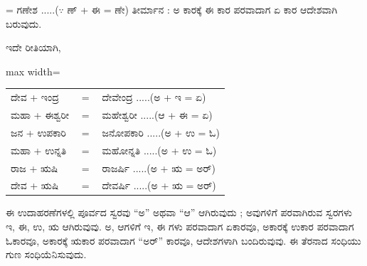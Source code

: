 \indent  = ಗಣೇಶ .....(\ensuremath{\because} ಣ್‌ + ಈ = ಣೇ) ತೀರ್ಮಾನ : ಅ ಕಾರಕ್ಕೆ ಈ ಕಾರ ಪರವಾದಾಗ ಏ ಕಾರ ಆದೇಶವಾಗಿ ಬರುವುದು.\par

\indent ಇದೇ ರೀತಿಯಾಗಿ,\par

\begin{kbvderiv}
\vspace{4pt plus 3pt minus 1pt}
\begin{center}\begin{adjustbox}{max width=\textwidth}
{\renewcommand{\arraystretch}{1.22}\setlength{\tabcolsep}{4pt}
\begin{tabular}{l c l}
ದೇವ + ಇಂದ್ರ & {\color{kbvgrey}$=$} & ದೇವೇಂದ್ರ .....(ಅ + ಇ = ಏ) \\
ಮಹಾ + ಈಶ್ವರೀ & {\color{kbvgrey}$=$} & ಮಹೇಶ್ವರೀ .....(ಆ + ಈ = ಏ) \\
ಜನ + ಉಪಕಾರಿ & {\color{kbvgrey}$=$} & ಜನೋಪಕಾರಿ .....(ಅ + ಉ = ಓ) \\
ಮಹಾ + ಉನ್ನತಿ & {\color{kbvgrey}$=$} & ಮಹೋನ್ನತಿ .....(ಅ + ಉ = ಓ) \\
ರಾಜ + ಋಷಿ & {\color{kbvgrey}$=$} & ರಾಜರ್ಷಿ .....(ಅ + ಋ = ಅರ್‌) \\
ದೇವ + ಋಷಿ & {\color{kbvgrey}$=$} & ದೇವರ್ಷಿ .....(ಅ + ಋ = ಅರ್‌) \\
\end{tabular}}
\end{adjustbox}\end{center}
\vspace{4pt plus 3pt minus 1pt}
\end{kbvderiv}

\indent ಈ ಉದಾಹರಣೆಗಳಲ್ಲಿ ಪೂರ್ವದ ಸ್ವರವು “ಅ” ಅಥವಾ “ಆ” ಆಗಿರುವುದು ; ಅವುಗಳಿಗೆ ಪರವಾಗಿರುವ ಸ್ವರಗಳು ಇ, ಈ, ಉ, ಋ ಆಗಿರುವುವು. ಅ, ಆಗಳಿಗೆ ಇ, ಈ ಗಳು ಪರವಾದಾಗ ಏಕಾರವೂ, ಅಕಾರಕ್ಕೆ ಉಕಾರ ಪರವಾದಾಗ ಓಕಾರವೂ, ಅಕಾರಕ್ಕೆ ಋಕಾರ ಪರವಾದಾಗ “ಅರ್‌” ಕಾರವೂ, ಆದೇಶಗಳಾಗಿ ಬಂದಿರುವುವು. ಈ ತೆರನಾದ ಸಂಧಿಯು ಗುಣ ಸಂಧಿಯೆನಿಸುವುದು.\par
